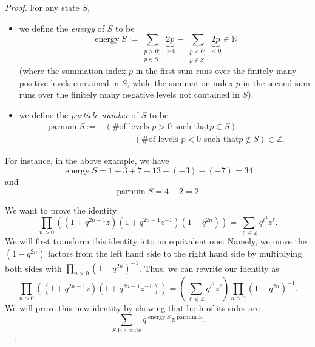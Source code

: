 \begin{proof}
For any state $S$,

\begin{itemize}
\item we define the \emph{energy} of $S$ to be%
\[
\operatorname*{energy}S:=\sum_{\substack{p>0;\\p\in S}}\underbrace{2p}%
_{>0}-\sum_{\substack{p<0;\\p\notin S}}\underbrace{2p}_{<0}\in\mathbb{N}%
\]
(where the summation index $p$ in the first sum runs over the finitely many
positive levels contained in $S$, while the summation index $p$ in the second
sum runs over the finitely many negative levels not contained in $S$).

\item we define the \emph{particle number} of $S$ to be%
\begin{align*}
\operatorname*{parnum}S:=  &  \left(  \text{\# of levels }p>0\text{ such that
}p\in S\right) \\
&  \ \ \ \ \ \ \ \ \ \ -\left(  \text{\# of levels }p<0\text{ such that
}p\notin S\right)  \in\mathbb{Z}.
\end{align*}

\end{itemize}

For instance, in the above example, we have%
\[
\operatorname*{energy}S=1+3+7+13-\left(  -3\right)  -\left(  -7\right)  =34
\]
and%
\[
\operatorname*{parnum}S=4-2=2.
\]


We want to prove the identity%
\[
\prod_{n>0}\left(  \left(  1+q^{2n-1}z\right)  \left(  1+q^{2n-1}%
z^{-1}\right)  \left(  1-q^{2n}\right)  \right)  =\sum_{\ell\in\mathbb{Z}%
}q^{\ell^{2}}z^{\ell}.
\]
We will first transform this identity into an equivalent one: Namely, we move
the $\left(  1-q^{2n}\right)  $ factors from the left hand side to the right
hand side by multiplying both sides with $\prod_{n>0}\left(  1-q^{2n}\right)
^{-1}$. Thus, we can rewrite our identity as%
\[
\prod_{n>0}\left(  \left(  1+q^{2n-1}z\right)  \left(  1+q^{2n-1}%
z^{-1}\right)  \right)  =\left(  \sum_{\ell\in\mathbb{Z}}q^{\ell^{2}}z^{\ell
}\right)  \prod_{n>0}\left(  1-q^{2n}\right)  ^{-1}.
\]
We will prove this new identity by showing that both of its sides are%
\[
\sum_{S\text{ is a state}}q^{\operatorname*{energy}S}z^{\operatorname*{parnum}%
S}.
\]



\end{proof}
